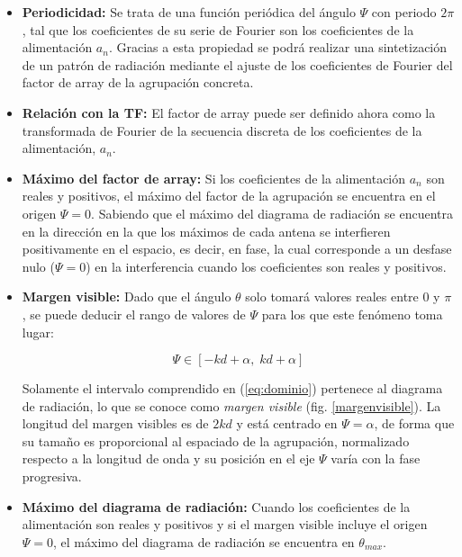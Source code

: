 \begin{itemize}
\item \textbf{Periodicidad: }Se trata de una función periódica del ángulo $\Psi$ con periodo $2\pi$, tal que los coeficientes de su serie de Fourier son los coeficientes de la alimentación $a_{n}$. Gracias a esta propiedad se podrá realizar una sintetización de un patrón de radiación mediante el ajuste de los coeficientes de Fourier del factor de array de la agrupación concreta.

\item \textbf{Relación con la TF: }El factor de array puede ser definido ahora como la transformada de Fourier de la secuencia discreta de los coeficientes de la alimentación, $a_{n}$.

\item \textbf{Máximo del factor de array: }Si los coeficientes de la alimentación $a_{n}$ son reales y positivos, el máximo del factor de la agrupación se encuentra en el origen $\Psi=0$. Sabiendo que el máximo del diagrama de radiación se encuentra en la dirección en la que los máximos de cada antena se interfieren positivamente en el espacio, es decir, en fase, la cual corresponde a un desfase nulo ($\Psi=0$) en la interferencia cuando los coeficientes son reales y positivos.

\item \textbf{Margen visible: }Dado que el ángulo $\theta$ solo tomará valores reales entre 0 y $\pi$, se puede deducir el rango de valores de $\Psi$ para los que este fenómeno toma lugar:

\begin{equation}
	\Psi \in \left [ -kd+\alpha ,\; kd+\alpha \right ]
	\label{eq:dominio}
\end{equation}

\par Solamente el intervalo comprendido en (\ref{eq:dominio}) pertenece al diagrama de radiación, lo que se conoce como \textit{margen visible} (fig. \ref{margenvisible}). La longitud del margen visibles es de $2kd$ y está centrado en $\Psi=\alpha$, de forma que su tamaño es proporcional al espaciado de la agrupación, normalizado respecto a la longitud de onda y su posición en el eje $\Psi$ varía con la fase progresiva.

\item \textbf{Máximo del diagrama de radiación: }Cuando los coeficientes de la alimentación son reales y positivos y si el margen visible incluye el origen $\Psi=0$, el máximo del diagrama de radiación se encuentra en $\theta_{max}$. 


\end{itemize}
